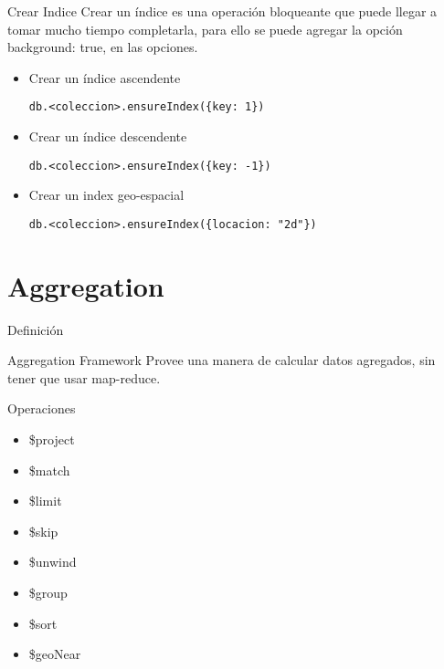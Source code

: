 \documentclass[12pt]{beamer}
\begin{document}
\begin{frame}[fragile]{Crear Indice}
  Crear un índice es una operación bloqueante que puede llegar a tomar
  mucho tiempo completarla, para ello se puede agregar la opción 
  {background: true}, en las opciones.

  \begin{itemize}
  \item Crear un índice ascendente
    \begin{verbatim}
db.<coleccion>.ensureIndex({key: 1})
    \end{verbatim}

  \item Crear un índice descendente
    \begin{verbatim}
db.<coleccion>.ensureIndex({key: -1})
    \end{verbatim}


    \item Crear un index geo-espacial
    \begin{verbatim}
db.<coleccion>.ensureIndex({locacion: "2d"})
    \end{verbatim}
  \end{itemize}
\end{frame}


\section{Aggregation}
\begin{frame}{Definición}
\
\begin{block}{Aggregation Framework}
  Provee una manera de calcular datos agregados, sin tener que usar map-reduce.
\end{block}
\end{frame}

\begin{frame}{Operaciones}
  
  \begin{itemize}
    \item \$project
    \item \$match
    \item \$limit
    \item \$skip
    \item \$unwind
    \item \$group
    \item \$sort
    \item \$geoNear    
    \end{itemize}
\end{frame}
\end{document}

